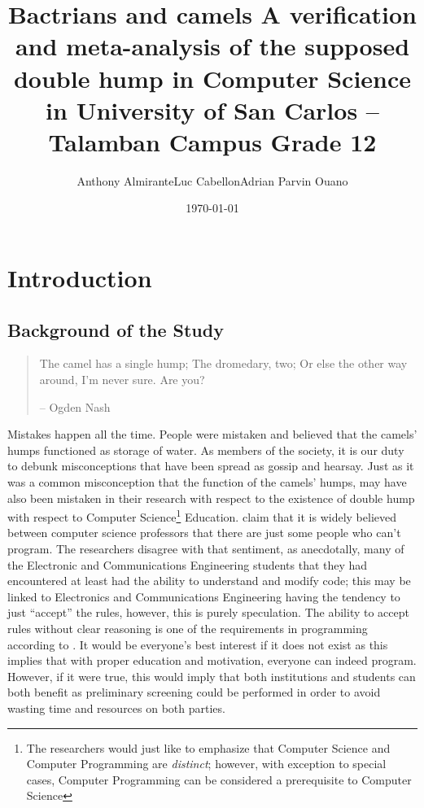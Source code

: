 \documentclass[12pt]{article}
\author{Anthony Almirante\nl{}Luc Cabellon\nl{}Adrian Parvin Ouano}
\date{\today}
\title{Bactrians and camels A verification and meta-analysis of the supposed double hump in Computer Science in University of San Carlos -- Talamban Campus Grade 12}
\begin{document}
\maketitle
\tableofcontents

\clearpage
\pagestyle{fancy}
\section{Introduction}
\label{sec:orgda1a6c7}
\subsection{Background of the Study}
\label{sec:org489662f}
\begin{quote}
The camel has a single hump; The dromedary, two; Or else the other way
around, I'm never sure. Are you?

-- Ogden Nash
\end{quote}

Mistakes happen all the time. 
People were mistaken and believed that the camels' humps functioned as storage of water. 
As members of the society, it is our duty to debunk misconceptions 
that have been spread as gossip and hearsay.
Just as it was a common misconception that the function of the camels' humps,
\cite{dehnadi2006camel} may have also been mistaken in their research
with respect to the existence of double hump with respect to Computer Science\footnote{The researchers would just like to emphasize that Computer Science and Computer Programming are \emph{distinct}; 
however, with exception to special cases, Computer Programming can be considered a prerequisite to Computer Science} 
Education. 
\citep{bornat2014camels,bornat2008mental} claim that 
it is widely believed between computer science professors that 
there are just some people who can't program.
The researchers disagree with that sentiment, as anecdotally, 
many of the Electronic and Communications Engineering students that they had encountered 
at least had the ability to understand and modify code; 
this may be linked to Electronics and Communications Engineering having the tendency to just ``accept'' the rules, 
however, this is purely speculation. 
The ability to accept rules without clear reasoning is
one of the requirements in programming according to \cite{dehnadi2006camel}.
It would be everyone's best interest if it does not exist as 
this implies that with proper education and motivation, 
everyone can indeed program. 
However, if it were true, this would imply that both \glspl{institution} and students 
can both benefit as preliminary screening could be performed 
in order to avoid wasting time and resources on both parties.
\end{document}
